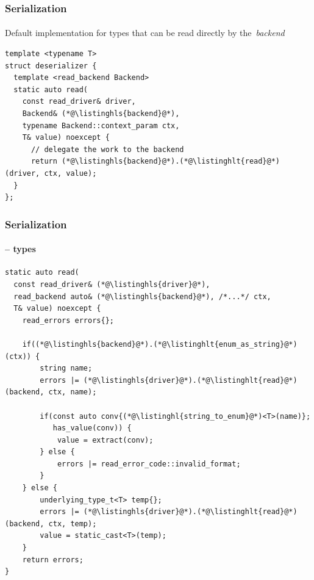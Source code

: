 \documentclass[compress,table,xcolor=table]{beamer}
\begin{document}
\begin{frame}[fragile]
  \frametitle{Serialization}
  \framesubtitle{}
  Default implementation for types that can be read directly by the~{\em backend}
  \begin{lstlisting}[language=c++2x,basicstyle=\small\ttfamily]
template <typename T>
struct deserializer {
  template <read_backend Backend>
  static auto read(
    const read_driver& driver,
    Backend& (*@\listinghls{backend}@*),
    typename Backend::context_param ctx,
    T& value) noexcept {
      // delegate the work to the backend
      return (*@\listinghls{backend}@*).(*@\listinghlt{read}@*)(driver, ctx, value);
  }
};
  \end{lstlisting}
\end{frame}
\begin{frame}[fragile]
  \frametitle{Serialization}
  \framesubtitle{ --  types}
  \begin{lstlisting}[language=c++2x,basicstyle=\scriptsize\ttfamily]
static auto read(
  const read_driver& (*@\listinghls{driver}@*),
  read_backend auto& (*@\listinghls{backend}@*), /*...*/ ctx,
  T& value) noexcept {
    read_errors errors{};

    if((*@\listinghls{backend}@*).(*@\listinghlt{enum_as_string}@*)(ctx)) {
        string name;
        errors |= (*@\listinghls{driver}@*).(*@\listinghlt{read}@*)(backend, ctx, name);

        if(const auto conv{(*@\listinghl{string_to_enum}@*)<T>(name)};
           has_value(conv)) {
            value = extract(conv);
        } else {
            errors |= read_error_code::invalid_format;
        }
    } else {
        underlying_type_t<T> temp{};
        errors |= (*@\listinghls{driver}@*).(*@\listinghlt{read}@*)(backend, ctx, temp);
        value = static_cast<T>(temp);
    }
    return errors;
}
  \end{lstlisting}
\end{frame}
\end{document}
